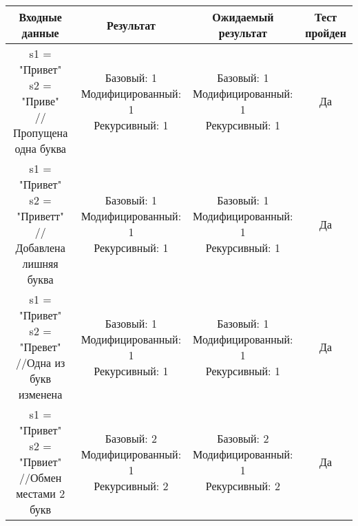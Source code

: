 	
	
	
	
	\newpage
	

	\begin{center}
		\begin{tabular}{|c|c|c|c|}
			\hline
			Входные данные & Результат & Ожидаемый результат& Тест пройден\\
			
			\hline
			\makecell{s1 = "Привет" \\ s2 = "Приве" \\ // Пропущена одна буква} &
			\makecell{Базовый: 1\\Модифицированный: 1\\Рекурсивный: 1} & 
			\makecell{Базовый: 1\\Модифицированный: 1\\Рекурсивный: 1} & Да\\
			
			\hline
			\makecell{s1 = "Привет" \\ s2 = "Приветт" \\ //Добавлена лишняя буква} &
			\makecell{Базовый: 1\\Модифицированный: 1\\Рекурсивный: 1} & 
			\makecell{Базовый: 1\\Модифицированный: 1\\Рекурсивный: 1} & Да\\
			
			\hline
			\makecell{s1 = "Привет" \\ s2 = "Превет" \\ //Одна из букв изменена} &
			\makecell{Базовый: 1\\Модифицированный: 1\\Рекурсивный: 1} & 
			\makecell{Базовый: 1\\Модифицированный: 1\\Рекурсивный: 1} & Да\\
			
			\hline
			\makecell{s1 = "Привет" \\ s2 = "Првиет" \\ //Обмен местами 2 букв} &
			\makecell{Базовый: 2\\Модифицированный: 1\\Рекурсивный: 2} & 
			\makecell{Базовый: 2\\Модифицированный: 1\\Рекурсивный: 2} & Да\\
			

\end{tabular}
\end{center}
